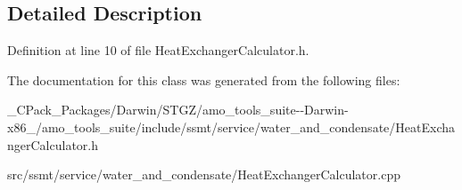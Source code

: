 \subsection{Detailed Description}


Definition at line 10 of file Heat\+Exchanger\+Calculator.\+h.



The documentation for this class was generated from the following files\+:\begin{DoxyCompactItemize}
\item 
\+\_\+\+C\+Pack\+\_\+\+Packages/\+Darwin/\+S\+T\+G\+Z/amo\+\_\+tools\+\_\+suite-\/-\/\+Darwin-\/x86\+\_/amo\+\_\+tools\+\_\+suite/include/ssmt/service/water\+\_\+and\+\_\+condensate/Heat\+Exchanger\+Calculator.\+h\item 
src/ssmt/service/water\+\_\+and\+\_\+condensate/Heat\+Exchanger\+Calculator.\+cpp\end{DoxyCompactItemize}

